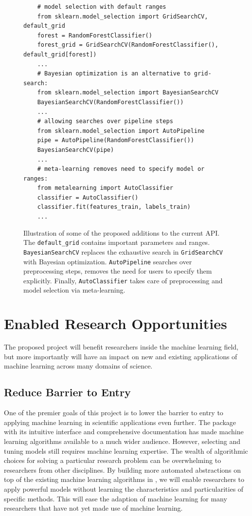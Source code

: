 \begin{figure}
    \begin{verbatim}
    # model selection with default ranges
    from sklearn.model_selection import GridSearchCV, default_grid
    forest = RandomForestClassifier()
    forest_grid = GridSearchCV(RandomForestClassifier(), default_grid[forest])
    ... 
    # Bayesian optimization is an alternative to grid-search:
    from sklearn.model_selection import BayesianSearchCV
    BayesianSearchCV(RandomForestClassifier())
    ... 
    # allowing searches over pipeline steps
    from sklearn.model_selection import AutoPipeline
    pipe = AutoPipeline(RandomForestClassifier())
    BayesianSearchCV(pipe)
    ... 
    # meta-learning removes need to specify model or ranges:
    from metalearning import AutoClassifier
    classifier = AutoClassifier()
    classifier.fit(features_train, labels_train)
    ... 
    \end{verbatim}
    \vspace{-5mm}
    \label{additions_interface}
    \caption{Illustration of some of the proposed additions to the current
        \sklearn{} API\@. The \texttt{default\_grid} contains important parameters
        and ranges. \texttt{BayesianSearchCV} replaces the exhaustive search in
        \texttt{GridSearchCV} with Bayesian optimization. \texttt{AutoPipeline}
        searches over preprocessing steps, removes the need for users to
        specify them explicitly. Finally, \texttt{AutoClassifier} takes care of
        preprocessing and model selection via meta-learning.}
\end{figure}

\section{Enabled Research Opportunities}
The proposed project will benefit researchers inside the machine learning field,
but more importantly will have an impact on new and existing applications of machine
learning across many domains of science.

\subsection{Reduce Barrier to Entry}
One of the premier goals of this project is to lower the barrier to entry
to applying machine learning in scientific applications even further.
The \sklearn{} package with its intuitive interface and comprehensive documentation
has made machine learning algorithms available to a much wider audience.
However, selecting and tuning models still requires machine learning expertise.
The wealth of algorithmic choices for solving a particular research problem can be
overwhelming to researchers from other disciplines. By building more automated
abstractions on top of the existing machine learning algorithms in \sklearn{},
we will enable researchers to apply powerful models without learning
the characteristics and particularities of specific methods.
This will ease the adaption of machine learning for many researchers
that have not yet made use of machine learning.

